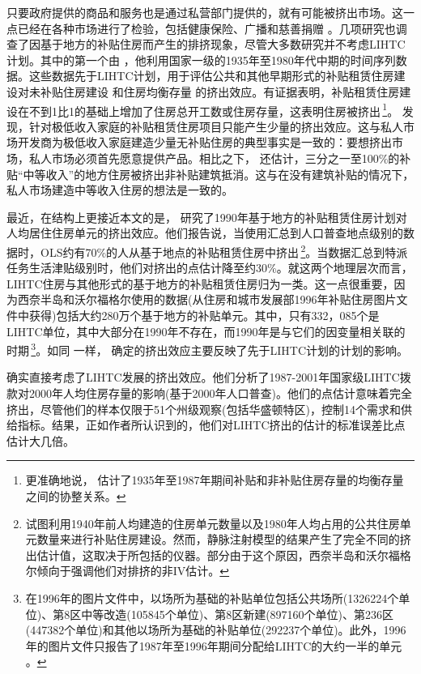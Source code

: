 \documentclass[lang=cn,11pt,a4paper]{paper}
\begin{document}
只要政府提供的商品和服务也是通过私营部门提供的，就有可能被挤出市场。这一点已经在各种市场进行了检验，包括健康保险、广播和慈善捐赠 \citep{Cutler1996391,Berry1999189,Andreoni2003792}。几项研究也调查了因基于地方的补贴住房而产生的排挤现象，尽管大多数研究并不考虑LIHTC计划。其中的第一个由 \cite{Murray1983590,Murray1999107}，他利用国家一级的1935年至1980年代中期的时间序列数据。这些数据先于LIHTC计划，用于评估公共和其他早期形式的补贴租赁住房建设对未补贴住房建设 \citep{Murray1983590} 和住房均衡存量 \citep{Murray1999107} 的挤出效应。有证据表明，补贴租赁住房建设在不到1比1的基础上增加了住房总开工数或住房存量，这表明住房被挤出\,\footnote{更准确地说，\cite{Murray1999107} 估计了1935年至1987年期间补贴和非补贴住房存量的均衡存量之间的协整关系。}。\cite{Murray1999107} 发现，针对极低收入家庭的补贴租赁住房项目只能产生少量的挤出效应。这与私人市场开发商为极低收入家庭建造少量无补贴住房的典型事实是一致的：要想挤出市场，私人市场必须首先愿意提供产品。相比之下，\cite{Murray1999107} 还估计，三分之一至100\%的补贴“中等收入”的地方住房被挤出非补贴建筑抵消。这与在没有建筑补贴的情况下，私人市场建造中等收入住房的想法是一致的。

最近，在结构上更接近本文的是，\cite{Sinai20052137} 研究了1990年基于地方的补贴租赁住房计划对人均居住住房单元的挤出效应。他们报告说，当使用汇总到人口普查地点级别的数据时，OLS约有70\%的人从基于地点的补贴租赁住房中挤出\,\footnote{\cite{Sinai20052137} 试图利用1940年前人均建造的住房单元数量以及1980年人均占用的公共住房单元数量来进行补贴住房建设。然而，静脉注射模型的结果产生了完全不同的挤出估计值，这取决于所包括的仪器。部分由于这个原因，西奈半岛和沃尔福格尔倾向于强调他们对排挤的非IV估计。}。当数据汇总到特派任务生活津贴级别时，他们对挤出的点估计降至约30\%。就这两个地理层次而言，LIHTC住房与其他形式的基于地方的补贴租赁住房归为一类。这一点很重要，因为西奈半岛和沃尔福格尔使用的数据(从住房和城市发展部1996年补贴住房图片文件中获得)包括大约280万个基于地方的补贴单元。其中，只有332，085个是LIHTC单位，其中大部分在1990年不存在，而1990年是与它们的因变量相关联的时期\,\footnote{在1996年的图片文件中，以场所为基础的补贴单位包括公共场所(1326224个单位)、第8区中等改造(105845个单位)、第8区新建(897160个单位)、第236区(447382个单位)和其他以场所为基础的补贴单位(292237个单位)。此外，1996年的图片文件只报告了1987年至1996年期间分配给LIHTC的大约一半的单元 \citep{Malpezzi2002360}。}。如同 \cite{Murray1983590,Murray1999107} 一样，\cite{Sinai20052137} 确定的挤出效应主要反映了先于LIHTC计划的计划的影响。

\cite{Malpezzi2002360} 确实直接考虑了LIHTC发展的挤出效应。他们分析了1987-2001年国家级LIHTC拨款对2000年人均住房存量的影响(基于2000年人口普查)。他们的点估计意味着完全挤出，尽管他们的样本仅限于51个州级观察(包括华盛顿特区)，控制14个需求和供给指标。结果，正如作者所认识到的，他们对LIHTC挤出的估计的标准误差比点估计大几倍。
\end{document}
